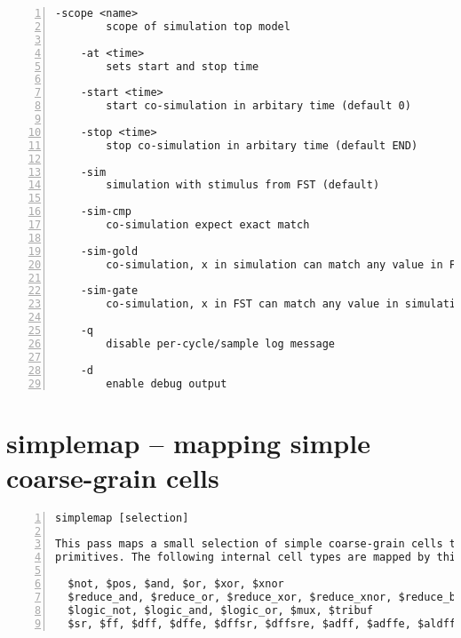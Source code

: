 \begin{lstlisting}[numbers=left,frame=single]
    -scope <name>
        scope of simulation top model

    -at <time>
        sets start and stop time

    -start <time>
        start co-simulation in arbitary time (default 0)

    -stop <time>
        stop co-simulation in arbitary time (default END)

    -sim
        simulation with stimulus from FST (default)

    -sim-cmp
        co-simulation expect exact match

    -sim-gold
        co-simulation, x in simulation can match any value in FST

    -sim-gate
        co-simulation, x in FST can match any value in simulation

    -q
        disable per-cycle/sample log message

    -d
        enable debug output
\end{lstlisting}

\section{simplemap -- mapping simple coarse-grain cells}
\label{cmd:simplemap}
\begin{lstlisting}[numbers=left,frame=single]
    simplemap [selection]

This pass maps a small selection of simple coarse-grain cells to yosys gate
primitives. The following internal cell types are mapped by this pass:

  $not, $pos, $and, $or, $xor, $xnor
  $reduce_and, $reduce_or, $reduce_xor, $reduce_xnor, $reduce_bool
  $logic_not, $logic_and, $logic_or, $mux, $tribuf
  $sr, $ff, $dff, $dffe, $dffsr, $dffsre, $adff, $adffe, $aldff, $aldffe, $sdff, $sdffe, $sdffce, $dlatch, $adlatch, $dlatchsr
\end{lstlisting}

